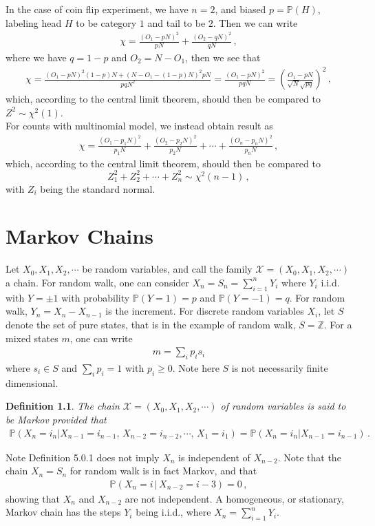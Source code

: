 \documentclass[11pt, onesided]{book}
\theoremstyle{break}
\theoremstyle{break}
\newtheorem{defn}{Definition}[thm]
\newcommand{\Z}{\mathbb{Z}}
\begin{document}
In the case of coin flip experiment, we have $n=2$, and biased $p = \mathbb{P}(H)$, labeling head $H$ to be category $1$ and tail to be $2$. Then we can write
\begin{align*}
\chi = \frac{(O_1 - pN)^2}{pN} + \frac{(O_2 - qN)^2}{qN}\,,
\end{align*}
where we have $q = 1-p$ and $O_2 = N - O_1$, then we see that
\begin{align*}
\chi = \frac{(O_1 - pN)^2 (1-p) N + (N - O_1 - (1-p)N )^2 pN}{pqN^2} = \frac{(O_1-pN)^2}{pqN} = \left(\frac{O_1 - pN}{\sqrt{N}\sqrt{pq}} \right)^2\,,
\end{align*}
which, according to the central limit theorem, should then be compared to $Z^2 \sim \chi^2(1)$. \\

For counts with multinomial model, we instead obtain result as
\begin{align*}
\chi = \frac{(O_1 - p_1N)^2}{p_1N} + \frac{(O_2 - p_2N)^2}{p_2N} + \cdots + \frac{(O_n - p_nN)^2}{p_nN}\,,
\end{align*}
which, according to the central limit theorem, should then be compared to 
$$Z_1^2 + Z_2^2 + \cdots + Z_n^2 \sim \chi^2(n-1)\,,$$ 
with $Z_i$ being the standard normal. 


\chapter{Markov Chains}
Let $X_0,X_1,X_2,\cdots$ be random variables, and call the family $\mathcal{X} = (X_0,X_1,X_2,\cdots)$ a chain. For random walk, one can consider $X_n = S_n = \sum_{i=1}^n Y_i$ where $Y_i$ i.i.d. with $Y=\pm 1$ with probability $\mathbb{P}(Y = 1) = p$ and $\mathbb{P}(Y = -1) = q$. For random walk, $Y_n = X_n - X_{n-1}$ is the increment. For discrete random variables $X_i$, let $S$ denote the set of pure states, that is in the example of random walk, $S = \Z$. For a mixed states $m$, one can write
\begin{align*}
m = \sum_{i} p_i s_i
\end{align*}
where $s_i \in S$ and $\sum_{i}p_i = 1$ with $p_i \geq 0$. Note here $S$ is not necessarily finite dimensional. 
\begin{defn}
The chain $\mathcal{X} =  (X_0,X_1,X_2,\cdots)$ of random variables is said to be Markov provided that 
\begin{align*}
\mathbb{P}\left(X_n = i_n | X_{n-1} = i_{n-1},\, X_{n-2} = i_{n-2},\cdots,\, X_1 = i_1\right) = \mathbb{P}(X_n = i_n | X_{n-1}=i_{n-1})\,.
\end{align*}
\end{defn}
Note Definition 5.0.1 does not imply $X_n$ is independent of $X_{n-2}$. Note that the chain $X_n=S_n$ for random walk is in fact Markov, and that
\begin{align*}
\mathbb{P}(X_n = i\, | \,X_{n-2}= i-3) = 0\,,
\end{align*}
showing that $X_n$ and $X_{n-2}$ are not independent. A homogeneous, or stationary, Markov chain has the steps $Y_i$ being i.i.d., where $X_n = \sum_{i=1}^n Y_i$. \\
\end{document}

